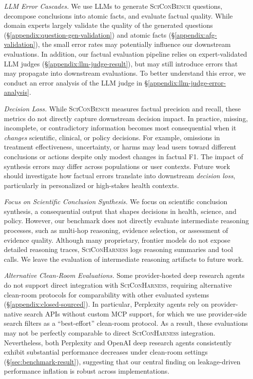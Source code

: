 \documentclass{article}
\begin{document}
\textit{LLM Error Cascades.} We use LLMs to generate \textsc{SciConBench} questions, decompose conclusions into atomic facts, and evaluate factual quality. While domain experts largely validate the quality of the generated questions (\S\ref{appendix:question-gen-validation}) and atomic facts (\S\ref{appendix:afg-validation}), the small error rates may potentially influence our downstream evaluations. In addition, our factual evaluation pipeline relies on expert-validated LLM judges (\S\ref{appendix:llm-judge-result}), but may still introduce errors that may propagate into downstream evaluations. To better understand this error, we conduct an error analysis of the LLM judge in \S\ref{appendix:llm-judge-error-analysis}.

\textit{Decision Loss.} While \textsc{SciConBench} measures factual precision and recall, these metrics do not directly capture downstream decision impact. In practice, missing, incomplete, or contradictory information becomes most consequential when it \textit{changes} scientific, clinical, or policy decisions. For example, omissions in treatment effectiveness, uncertainty, or harms may lead users toward different conclusions or actions despite only modest changes in factual F1. The impact of synthesis errors may differ across populations or user contexts. Future work should investigate how factual errors translate into downstream \textit{decision loss}, particularly in personalized or high-stakes health contexts.

\textit{Focus on Scientific Conclusion Synthesis.} We focus on scientific conclusion synthesis, a consequential output that shapes decisions in health, science, and policy. However, our benchmark does not directly evaluate intermediate reasoning processes, such as multi-hop reasoning, evidence selection, or assessment of evidence quality. Although many proprietary, frontier models do not expose detailed reasoning traces, \textsc{SciConHarness} logs reasoning summaries and tool calls. We leave the evaluation of intermediate reasoning artifacts to future work.

\textit{Alternative Clean-Room Evaluations.} Some provider-hosted deep research agents do not support direct integration with \textsc{SciConHarness}, requiring alternative clean-room protocols for comparability with other evaluated systems (\S\ref{appendix:closed-sourced}). In particular, Perplexity agents rely on provider-native search APIs without custom MCP support, for which we use provider-side search filters as a ``best-effort'' clean-room protocol. As a result, these evaluations may not be perfectly comparable to direct \textsc{SciConHarness} integration. Nevertheless, both Perplexity and OpenAI deep research agents consistently exhibit substantial performance decreases under clean-room settings (\S\ref{sec:benchmark-result}), suggesting that our central finding on leakage-driven performance inflation is robust across implementations.
\end{document}
